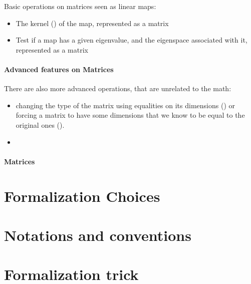 Basic operations on matrices seen as linear maps:
\begin{itemize}
\item The kernel () of the map, represented as a matrix
\item Test if a map has a given eigenvalue, and the eigenspace
  associated with it, represented as a matrix
\end{itemize}


\paragraph{Advanced features on Matrices}

There are also more advanced operations, that are unrelated to the
math:
\begin{itemize}
\item changing the type of the matrix using equalities on its
  dimensions () or forcing a matrix to have some dimensions
  that we know to be equal to the original ones ().
\item
\end{itemize}

\paragraph{Matrices}

\section{Formalization Choices}

\section{Notations and conventions}

\section{Formalization trick}

